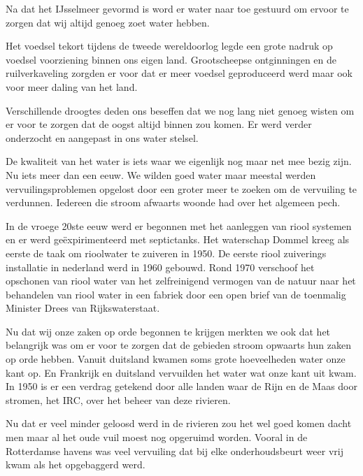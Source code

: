 Na dat het IJsselmeer gevormd is word er water naar toe gestuurd om ervoor te zorgen dat wij altijd genoeg zoet water hebben.

Het voedsel tekort tijdens de tweede wereldoorlog legde een grote nadruk op voedsel voorziening binnen ons eigen land.
Grootscheepse ontginningen en de ruilverkaveling zorgden er voor dat er meer voedsel geproduceerd werd maar ook voor meer daling van het land.

Verschillende droogtes deden ons beseffen dat we nog lang niet genoeg wisten om er voor te zorgen dat de oogst altijd binnen zou komen.
Er werd verder onderzocht en aangepast in ons water stelsel.

De kwaliteit van het water is iets waar we eigenlijk nog maar net mee bezig zijn.
Nu iets meer dan een eeuw.
We wilden goed water maar meestal werden vervuilingsproblemen opgelost door een groter meer te zoeken om de vervuiling te verdunnen.
Iedereen die stroom afwaarts woonde had over het algemeen pech.

In de vroege 20ste eeuw werd er begonnen met het aanleggen van riool systemen en er werd ge\"expirimenteerd met septictanks.
Het waterschap Dommel kreeg als eerste de taak om rioolwater te zuiveren in 1950.
De eerste riool zuiverings installatie in nederland werd in 1960 gebouwd.
Rond 1970 verschoof het opschonen van riool water van het zelfreinigend vermogen van de natuur naar het behandelen van riool water in een fabriek door een open brief van de toenmalig Minister Drees van Rijkswaterstaat.

Nu dat wij onze zaken op orde begonnen te krijgen merkten we ook dat het belangrijk was om er voor te zorgen dat de gebieden stroom opwaarts hun zaken op orde hebben.
Vanuit duitsland kwamen soms grote hoeveelheden water onze kant op.
En Frankrijk en duitsland vervuilden het water wat onze kant uit kwam.
In 1950 is er een verdrag getekend door alle landen waar de Rijn en de Maas door stromen, het IRC, over het beheer van deze rivieren.

Nu dat er veel minder geloosd werd in de rivieren zou het wel goed komen dacht men maar al het oude vuil moest nog opgeruimd worden. 
Vooral in de Rotterdamse havens was veel vervuiling dat bij elke onderhoudsbeurt weer vrij kwam als het opgebaggerd werd.



